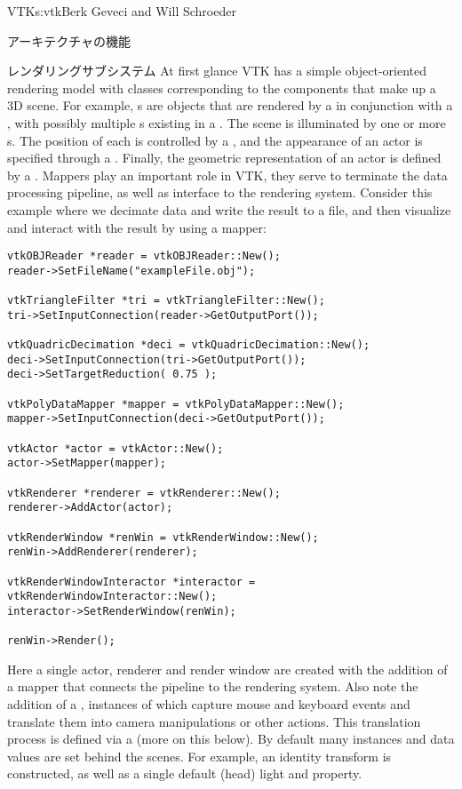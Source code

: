 \begin{aosachapter}{VTK}{s:vtk}{Berk Geveci and Will Schroeder}
\begin{aosasect1}{アーキテクチャの機能}
\begin{aosasect2}{レンダリングサブシステム}
At first glance VTK has a simple object-oriented rendering model with
classes corresponding to the components that make up a 3D scene. For
example, s are objects that are rendered by a
 in conjunction with a , with
possibly multiple s existing in a
. The scene is illuminated by one or more
s. The position of each  is controlled
by a , and the appearance of an actor is specified
through a . Finally, the geometric representation of
an actor is defined by a . Mappers play an important
role in VTK, they serve to terminate the data processing pipeline, as
well as interface to the rendering system. Consider this example where
we decimate data and write the result to a file, and then visualize
and interact with the result by using a mapper:

\begin{verbatim}
vtkOBJReader *reader = vtkOBJReader::New();
reader->SetFileName("exampleFile.obj");

vtkTriangleFilter *tri = vtkTriangleFilter::New();
tri->SetInputConnection(reader->GetOutputPort());

vtkQuadricDecimation *deci = vtkQuadricDecimation::New();
deci->SetInputConnection(tri->GetOutputPort());
deci->SetTargetReduction( 0.75 );

vtkPolyDataMapper *mapper = vtkPolyDataMapper::New();
mapper->SetInputConnection(deci->GetOutputPort());

vtkActor *actor = vtkActor::New();
actor->SetMapper(mapper);

vtkRenderer *renderer = vtkRenderer::New();
renderer->AddActor(actor);

vtkRenderWindow *renWin = vtkRenderWindow::New();
renWin->AddRenderer(renderer);

vtkRenderWindowInteractor *interactor = vtkRenderWindowInteractor::New();
interactor->SetRenderWindow(renWin);

renWin->Render();
\end{verbatim}

Here a single actor, renderer and render window are created with the
addition of a mapper that connects the pipeline to the rendering
system. Also note the addition of a ,
instances of which capture mouse and keyboard events and translate
them into camera manipulations or other actions. This translation
process is defined via a  (more on this
below). By default many instances and data values are set behind the
scenes. For example, an identity transform is constructed, as well as a
single default (head) light and property.


\end{aosasect2}
\end{aosasect1}
\end{aosachapter}
